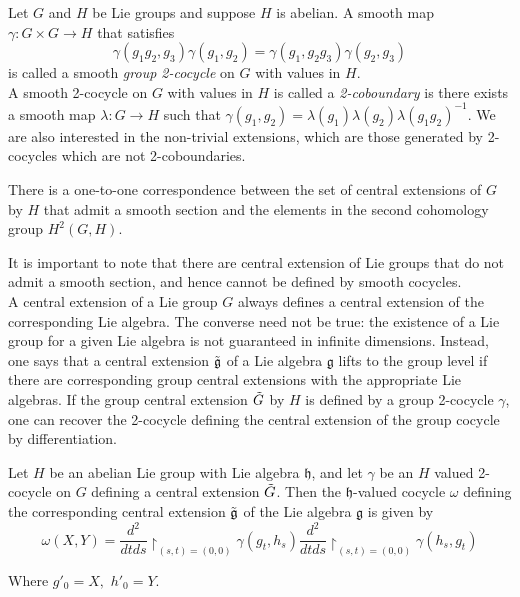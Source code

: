 \begin{defn}

Let $G$ and $H$ be Lie groups and suppose $H$ is abelian. A smooth map $ \gamma: G \times G \to H$ that satisfies
\[
	\gamma (g_1 g_2, g_3) \gamma (g_1, g_2) = \gamma (g_1, g_2 g_3) \gamma (g_2, g_3)
\]
is called a smooth \textit{group 2-cocycle} on $G$ with values in $H$.\\
\indent A smooth 2-cocycle on $G$ with values in $H$ is called a \textit{2-coboundary} is there exists a smooth map $ \lambda: G \to H$ such that $\gamma (g_1, g_2) = \lambda(g_1) \lambda(g_2) \lambda (g_1 g_2)^{-1}$. We are also interested in the non-trivial extensions, which are those generated by 2-cocycles which are not 2-coboundaries.
\end{defn}


\begin{prop}

	There is a one-to-one correspondence between the set of central extensions of $G$ by $H$ that admit a smooth section and the elements in the second cohomology group $H^2(G,H)$.

\end{prop}

It is important to note that there are central extension of Lie groups that do not admit a smooth section, and hence cannot be defined by smooth cocycles.\\
\indent A central extension of a Lie group $G$ always defines a central extension of the corresponding Lie algebra. The converse need not be true: the existence of a Lie group for a given Lie algebra is not guaranteed in infinite dimensions. Instead, one says that a central extension $ \Tilde{ \mathfrak{g} }$ of a Lie algebra $ \mathfrak{g}$ lifts to the group level if there are corresponding group central extensions with the appropriate Lie algebras. If the group central extension $ \Tilde{ G }$ by $H$ is defined by a group 2-cocycle $\gamma$, one can recover the 2-cocycle defining the central extension of the group cocycle by differentiation.


\begin{prop}

Let $H$ be an abelian Lie group with Lie algebra $ \mathfrak{h}$, and let $\gamma$ be an $H$ valued 2-cocycle on $G$ defining a central extension $ \Tilde{ G }$. Then the $ \mathfrak{h}$-valued cocycle $\omega$ defining the corresponding central extension $ \Tilde{ \mathfrak{g} }$ of the Lie algebra $ \mathfrak{g}$ is given by 
\[
	\omega(X,Y) = \frac{d^2}{dtds}\restriction_{(s,t)=(0,0)} \gamma(g_t, h_s)  \frac{d^2}{dtds}\restriction_{(s,t)=(0,0)} \gamma (h_s, g_t)
\]

Where $g'_0 = X, \hspace{4pt} h'_0 = Y$.
\end{prop}

